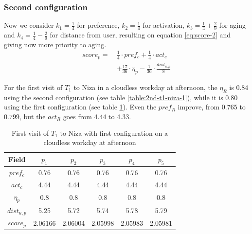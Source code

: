 \subsubsection{Second configuration} \label{section:experiment-2}
Now we consider $k_1 = \frac{1}{4}$ for preference, $k_2 = \frac{1}{4}$ for activation, $k_3 = \frac{1}{4} + \frac{2}{9}$ for aging and $k_4 = \frac{1}{4} - \frac{2}{9}$ for distance from user, resulting on equation \ref{eq:score-2} and giving now more priority to aging.
\begin{equation} \label{eq:score-2}
    \begin{split}
        score_p = \ &\frac{1}{4} \cdot pref_c + \frac{1}{4} \cdot act_c \\
                                        &+ \frac{17}{36} \cdot \eta_p - \frac{1}{36} \cdot \frac{dist_{u,p}}{8}
    \end{split}
\end{equation}

For the first visit of $T_1$ to Niza in a cloudless workday at afternoon, the $\eta_R$ is $0.84$ using the second configuration (see table \ref{table:2nd-t1-niza-1}), while it is $0.80$ using the first configuration (see table \ref{table:1st-t1-niza-1}). Even the $pref_R$ improve, from $0.765$ to $0.799$, but the $act_R$ goes from $4.44$ to $4.33$.

\begin{table}[h!]
    \centering
    \begin{tabular}{ |c|c|c|c|c|c| } 
        \hline
        Field   & $p_1$ & $p_2$ & $p_3$ & $p_4$ & $p_5$ \\
        \hline
        $pref_c$    &  0.76 & 0.76 & 0.76 & 0.76 & 0.76 \\
        $act_c$     & 4.44 & 4.44 & 4.44 & 4.44 & 4.44  \\
        $\eta_p$    & 0.8 & 0.8 & 0.8 & 0.8 & 0.8 \\
        $dist_{u,p}$ & 5.25 & 5.72 & 5.74 & 5.78 & 5.79 \\
        $score_p$    & 2.06166 & 2.06004 & 2.05998 & 2.05983 & 2.05981 \\
        
        \hline
    \end{tabular}
    \caption{First visit of $T_1$ to Niza with first configuration on a cloudless workday at afternoon}
    \label{table:1st-t1-niza-1}
\end{table}

